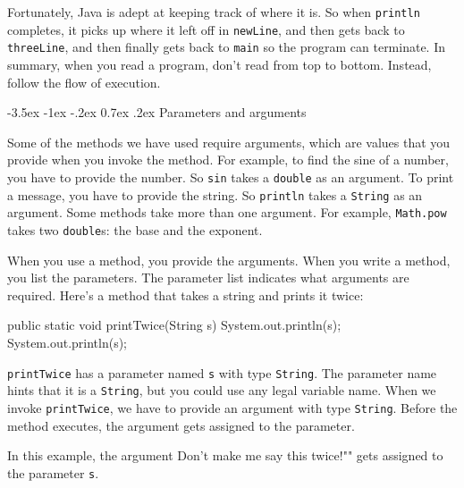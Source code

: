 \documentclass[12pt]{book}
\makeatletter
\theoremstyle{exercise}
\newcommand{\java}[1]{\verb"#1"}
\renewcommand{\section}{\@startsection {section}{1}{\z@}%
    {-3.5ex \@plus -1ex \@minus -.2ex}%
    {0.7ex \@plus.2ex}%
    {\normalfont\Large\bfseries}}
\newcommand{\java}[1]{\lstinline{#1}} %
\makeatother
\begin{document}
Fortunately, Java is adept at keeping track of where it is.
So when \java{println} completes, it picks up where it left off in \java{newLine}, and then gets back to \java{threeLine}, and then finally gets back to \java{main} so the program can terminate.
In summary, when you read a program, don't read from top to bottom.
Instead, follow the flow of execution.



\section{Parameters and arguments}


Some of the methods we have used require arguments, which are values that you provide when you invoke the method.
For example, to find the sine of a number, you have to provide the number.
So \java{sin} takes a \java{double} as an argument.
To print a message, you have to provide the string.
So \java{println} takes a \java{String} as an argument.
Some methods take more than one argument.
For example, \java{Math.pow} takes two \java{double}s: the base and the exponent.

When you use a method, you provide the arguments.
When you write a method, you list the parameters.
The parameter list indicates what arguments are required.
Here's a method that takes a string and prints it twice:

\begin{code}
    public static void printTwice(String s) {
        System.out.println(s);
        System.out.println(s);
    }
\end{code}

\java{printTwice} has a parameter named \java{s} with type \java{String}.
The parameter name hints that it is a \java{String}, but you could use any legal variable name.
When we invoke \java{printTwice}, we have to provide an argument with type \java{String}.
Before the method executes, the argument gets assigned to the parameter.

In this example, the argument \java{"Don't make me say this twice!"} gets assigned to the parameter \java{s}.
\end{document}
